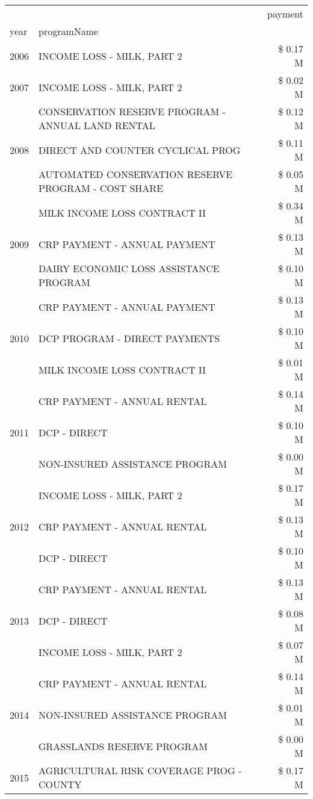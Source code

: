 \begin{tabular}{llr}
\toprule
 &  & payment \\
year & programName &  \\
\midrule
2006 & INCOME LOSS - MILK, PART 2 & \$ 0.17 M \\
\cline{1-3}
2007 & INCOME LOSS - MILK, PART 2 & \$ 0.02 M \\
\cline{1-3}
\multirow[t]{3}{*}{2008} & CONSERVATION RESERVE PROGRAM - ANNUAL LAND RENTAL & \$ 0.12 M \\
 & DIRECT AND COUNTER CYCLICAL PROG & \$ 0.11 M \\
 & AUTOMATED CONSERVATION RESERVE PROGRAM - COST SHARE & \$ 0.05 M \\
\cline{1-3}
\multirow[t]{3}{*}{2009} & MILK INCOME LOSS CONTRACT II & \$ 0.34 M \\
 & CRP PAYMENT - ANNUAL PAYMENT & \$ 0.13 M \\
 & DAIRY ECONOMIC LOSS ASSISTANCE PROGRAM & \$ 0.10 M \\
\cline{1-3}
\multirow[t]{3}{*}{2010} & CRP PAYMENT - ANNUAL PAYMENT & \$ 0.13 M \\
 & DCP PROGRAM - DIRECT PAYMENTS & \$ 0.10 M \\
 & MILK INCOME LOSS CONTRACT II & \$ 0.01 M \\
\cline{1-3}
\multirow[t]{3}{*}{2011} & CRP PAYMENT - ANNUAL RENTAL & \$ 0.14 M \\
 & DCP - DIRECT & \$ 0.10 M \\
 & NON-INSURED ASSISTANCE PROGRAM & \$ 0.00 M \\
\cline{1-3}
\multirow[t]{3}{*}{2012} & INCOME LOSS - MILK, PART 2 & \$ 0.17 M \\
 & CRP PAYMENT - ANNUAL RENTAL & \$ 0.13 M \\
 & DCP - DIRECT & \$ 0.10 M \\
\cline{1-3}
\multirow[t]{3}{*}{2013} & CRP PAYMENT - ANNUAL RENTAL & \$ 0.13 M \\
 & DCP - DIRECT & \$ 0.08 M \\
 & INCOME LOSS - MILK, PART 2 & \$ 0.07 M \\
\cline{1-3}
\multirow[t]{3}{*}{2014} & CRP PAYMENT - ANNUAL RENTAL & \$ 0.14 M \\
 & NON-INSURED ASSISTANCE PROGRAM & \$ 0.01 M \\
 & GRASSLANDS RESERVE PROGRAM & \$ 0.00 M \\
\cline{1-3}
\multirow[t]{3}{*}{2015} & AGRICULTURAL RISK COVERAGE PROG - COUNTY & \$ 0.17 M \\

\end{tabular}
